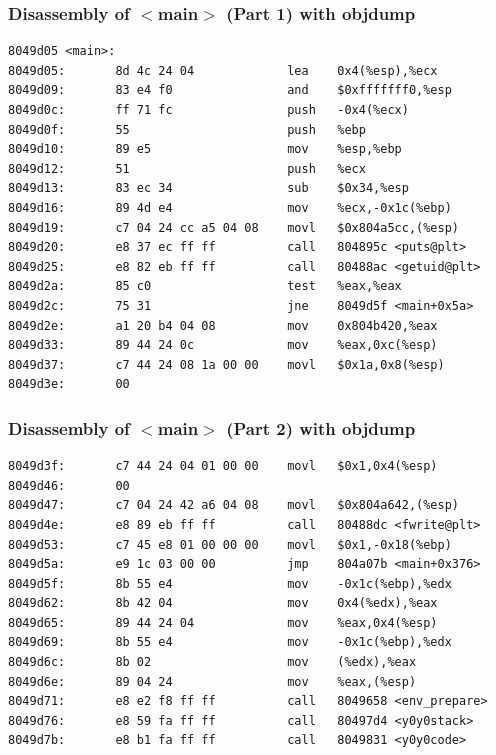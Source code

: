 \begin{frame}[fragile]
\frametitle{Disassembly of $<$main$>$ (Part 1) with objdump}
\small
\begin{verbatim}
8049d05 <main>:
8049d05:       8d 4c 24 04             lea    0x4(%esp),%ecx
8049d09:       83 e4 f0                and    $0xfffffff0,%esp
8049d0c:       ff 71 fc                push   -0x4(%ecx)
8049d0f:       55                      push   %ebp
8049d10:       89 e5                   mov    %esp,%ebp
8049d12:       51                      push   %ecx
8049d13:       83 ec 34                sub    $0x34,%esp
8049d16:       89 4d e4                mov    %ecx,-0x1c(%ebp)
8049d19:       c7 04 24 cc a5 04 08    movl   $0x804a5cc,(%esp)
8049d20:       e8 37 ec ff ff          call   804895c <puts@plt>
8049d25:       e8 82 eb ff ff          call   80488ac <getuid@plt>
8049d2a:       85 c0                   test   %eax,%eax
8049d2c:       75 31                   jne    8049d5f <main+0x5a>
8049d2e:       a1 20 b4 04 08          mov    0x804b420,%eax
8049d33:       89 44 24 0c             mov    %eax,0xc(%esp)
8049d37:       c7 44 24 08 1a 00 00    movl   $0x1a,0x8(%esp)
8049d3e:       00
\end{verbatim}

\end{frame}

\begin{frame}[fragile]
\frametitle{Disassembly of $<$main$>$ (Part 2) with objdump}

\begin{verbatim}
8049d3f:       c7 44 24 04 01 00 00    movl   $0x1,0x4(%esp)
8049d46:       00
8049d47:       c7 04 24 42 a6 04 08    movl   $0x804a642,(%esp)
8049d4e:       e8 89 eb ff ff          call   80488dc <fwrite@plt>
8049d53:       c7 45 e8 01 00 00 00    movl   $0x1,-0x18(%ebp)
8049d5a:       e9 1c 03 00 00          jmp    804a07b <main+0x376>
8049d5f:       8b 55 e4                mov    -0x1c(%ebp),%edx
8049d62:       8b 42 04                mov    0x4(%edx),%eax
8049d65:       89 44 24 04             mov    %eax,0x4(%esp)
8049d69:       8b 55 e4                mov    -0x1c(%ebp),%edx
8049d6c:       8b 02                   mov    (%edx),%eax
8049d6e:       89 04 24                mov    %eax,(%esp)
8049d71:       e8 e2 f8 ff ff          call   8049658 <env_prepare>
8049d76:       e8 59 fa ff ff          call   80497d4 <y0y0stack>
8049d7b:       e8 b1 fa ff ff          call   8049831 <y0y0code>
\end{verbatim}

\end{frame}




